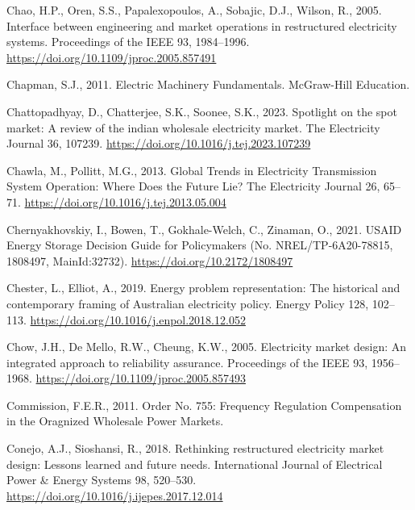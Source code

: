 \documentclass[12pt,a4paper,]{report}
\newlength{\cslhangindent}
\newenvironment{CSLReferences}[2] %
 {%
  \setlength{\parindent}{0pt}
  \ifodd #1 \everypar{\setlength{\hangindent}{\cslhangindent}}\ignorespaces\fi
  \ifnum #2 > 0
  \setlength{\parskip}{#2\baselineskip}
  \fi
 }%
 {}
\begin{document}
\begin{CSLReferences}{1}{0}
\leavevmode{}%
Chao, H.P., Oren, S.S., Papalexopoulos, A., Sobajic, D.J., Wilson, R.,
2005. Interface between engineering and market operations in
restructured electricity systems. Proceedings of the IEEE 93,
1984--1996. \url{https://doi.org/10.1109/jproc.2005.857491}

\leavevmode{}%
Chapman, S.J., 2011. Electric {Machinery Fundamentals}. {McGraw-Hill
Education}.

\leavevmode{}%
Chattopadhyay, D., Chatterjee, S.K., Soonee, S.K., 2023. Spotlight on
the spot market: {A} review of the indian wholesale electricity market.
The Electricity Journal 36, 107239.
\url{https://doi.org/10.1016/j.tej.2023.107239}

\leavevmode{}%
Chawla, M., Pollitt, M.G., 2013. Global {Trends} in {Electricity
Transmission System Operation}: {Where Does} the {Future Lie}? The
Electricity Journal 26, 65--71.
\url{https://doi.org/10.1016/j.tej.2013.05.004}

\leavevmode{}%
Chernyakhovskiy, I., Bowen, T., Gokhale-Welch, C., Zinaman, O., 2021.
{USAID Energy Storage Decision Guide} for {Policymakers} (No.
NREL/TP-6A20-78815, 1808497, MainId:32732).
\url{https://doi.org/10.2172/1808497}

\leavevmode{}%
Chester, L., Elliot, A., 2019. Energy problem representation: {The}
historical and contemporary framing of {Australian} electricity policy.
Energy Policy 128, 102--113.
\url{https://doi.org/10.1016/j.enpol.2018.12.052}

\leavevmode{}%
Chow, J.H., De Mello, R.W., Cheung, K.W., 2005. Electricity market
design: {An} integrated approach to reliability assurance. Proceedings
of the IEEE 93, 1956--1968.
\url{https://doi.org/10.1109/jproc.2005.857493}

\leavevmode{}%
Commission, F.E.R., 2011. Order {No}. 755: {Frequency Regulation
Compensation} in the {Oragnized Wholesale Power Markets}.

\leavevmode{}%
Conejo, A.J., Sioshansi, R., 2018. Rethinking restructured electricity
market design: {Lessons} learned and future needs. International Journal
of Electrical Power \& Energy Systems 98, 520--530.
\url{https://doi.org/10.1016/j.ijepes.2017.12.014}


\end{CSLReferences}
\end{document}
